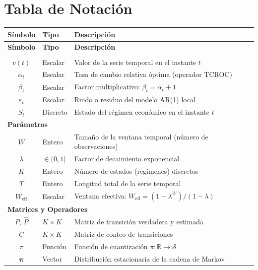 \chapter*{Tabla de Notación}
\label{chap:notacion}

\begin{longtable}{@{}clp{8cm}@{}}
\toprule
\textbf{Símbolo} & \textbf{Tipo} & \textbf{Descripción} \\
\midrule
\endfirsthead
\toprule
\textbf{Símbolo} & \textbf{Tipo} & \textbf{Descripción} \\
\midrule
\endhead
\bottomrule
\endfoot

\multicolumn{3}{l}{\textbf{Variables y Series}} \\
\midrule
$v(t)$ & Escalar & Valor de la serie temporal en el instante $t$ \\
$\alpha_t$ & Escalar & Tasa de cambio relativa óptima (operador TCROC) \\
$\beta_t$ & Escalar & Factor multiplicativo: $\beta_t = \alpha_t + 1$ \\
$\varepsilon_t$ & Escalar & Ruido o residuo del modelo AR(1) local \\
$S_t$ & Discreto & Estado del régimen económico en el instante $t$ \\
\midrule

\multicolumn{3}{l}{\textbf{Parámetros}} \\
\midrule
$W$ & Entero & Tamaño de la ventana temporal (número de observaciones) \\
$\lambda$ & $\in (0,1]$ & Factor de decaimiento exponencial \\
$K$ & Entero & Número de estados (regímenes) discretos \\
$T$ & Entero & Longitud total de la serie temporal \\
$W_{\text{eff}}$ & Escalar & Ventana efectiva: $W_{\text{eff}} = (1-\lambda^W)/(1-\lambda)$ \\
\midrule

\multicolumn{3}{l}{\textbf{Matrices y Operadores}} \\
\midrule
$P$, $\hat{P}$ & $K \times K$ & Matriz de transición verdadera y estimada \\
$C$ & $K \times K$ & Matriz de conteo de transiciones \\
$\pi$ & Función & Función de cuantización $\pi\colon \mathbb{R} \to \mathcal{S}$ \\
$\boldsymbol{\pi}$ & Vector & Distribución estacionaria de la cadena de Markov \\
\midrule


\end{longtable}
